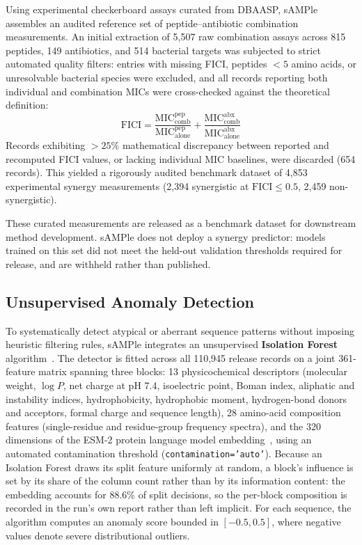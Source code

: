 \documentclass[unnumsec,webpdf,contemporary,large]{oup-authoring-template}%
\begin{document}
Using experimental checkerboard assays curated from DBAASP, sAMPle assembles an audited reference set of peptide--antibiotic combination measurements. An initial extraction of 5,507 raw combination assays across 815 peptides, 149 antibiotics, and 514 bacterial targets was subjected to strict automated quality filters: entries with missing FICI, peptides $<5$ amino acids, or unresolvable bacterial species were excluded, and all records reporting both individual and combination MICs were cross-checked against the theoretical definition:
\begin{equation}
\text{FICI} = \frac{\text{MIC}_{\text{comb}}^{\text{pep}}}{\text{MIC}_{\text{alone}}^{\text{pep}}} + \frac{\text{MIC}_{\text{comb}}^{\text{abx}}}{\text{MIC}_{\text{alone}}^{\text{abx}}}
\end{equation}
Records exhibiting $>25\%$ mathematical discrepancy between reported and recomputed FICI values, or lacking individual MIC baselines, were discarded (654 records). This yielded a rigorously audited benchmark dataset of 4,853 experimental synergy measurements (2,394 synergistic at $\text{FICI} \le 0.5$, 2,459 non-synergistic).

These curated measurements are released as a benchmark dataset for downstream method development. sAMPle does not deploy a synergy predictor: models trained on this set did not meet the held-out validation thresholds required for release, and are withheld rather than published.

\subsection{Unsupervised Anomaly Detection}

To systematically detect atypical or aberrant sequence patterns without imposing heuristic filtering rules, sAMPle integrates an unsupervised \textbf{Isolation Forest} algorithm~\cite{pedregosa2011scikit}. The detector is fitted across all 110,945 release records on a joint 361-feature matrix spanning three blocks: 13 physicochemical descriptors (molecular weight, $\log P$, net charge at pH 7.4, isoelectric point, Boman index, aliphatic and instability indices, hydrophobicity, hydrophobic moment, hydrogen-bond donors and acceptors, formal charge and sequence length), 28 amino-acid composition features (single-residue and residue-group frequency spectra), and the 320 dimensions of the ESM-2 protein language model embedding~\cite{lin2023evolutionary}, using an automated contamination threshold (\texttt{contamination='auto'}). Because an Isolation Forest draws its split feature uniformly at random, a block's influence is set by its share of the column count rather than by its information content: the embedding accounts for 88.6\% of split decisions, so the per-block composition is recorded in the run's own report rather than left implicit. For each sequence, the algorithm computes an anomaly score bounded in $[-0.5, 0.5]$, where negative values denote severe distributional outliers. 
\end{document}
